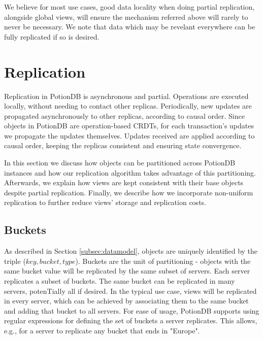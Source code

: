 \documentclass[sigconf, nonacm]{acmart}
\begin{document}
We believe for most use cases, good data locality when doing partial replication, alongside global views, will ensure the mechanism referred above will rarely to never be necessary.
We note that data which may be revelant everywhere can be fully replicated if so is desired.

\section{Replication}
\label{sec:replication}
Replication in PotionDB is asynchronous and partial.
Operations are executed locally, without needing to contact other replicas.
Periodically, new updates are propagated asynchronously to other replicas, according to causal order.
Since objects in PotionDB are operation-based CRDTs, for each transaction's updates we propagate the updates themselves.
Updates received are applied according to causal order, keeping the replicas consistent and ensuring state convergence.

In this section we discuss how objects can be partitioned across PotionDB instances and how our replication algorithm takes advantage of this partitioning.
Afterwards, we explain how views are kept consistent with their base objects despite partial replication.
Finally, we describe how we incorporate non-uniform replication to further reduce views' storage and replication costs.

\subsection{Buckets}
\label{subsec:buckets}
As described in Section \ref{subsec:datamodel}, objects are uniquely identified by the triple ($key, bucket, type$).
Buckets are the unit of partitioning - objects with the same bucket value will be replicated by the same subset of servers.
Each server replicates a subset of buckets.
The same bucket can be replicated in many servers, potenTially all if desired.
In the typical use case, views will be replicated in every server, which can be achieved by associating them to the same bucket and adding that bucket to all servers.
For ease of usage, PotionDB supports using regular expressions for defining the set of buckets a server replicates.
This allows, e.g., for a server to replicate any bucket that ends in "Europe".
\end{document}
